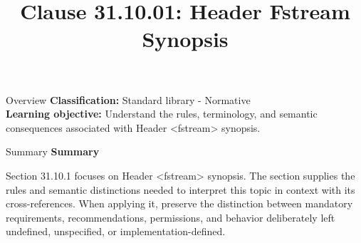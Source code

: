 \documentclass[10pt,letterpaper]{article}
\title{Clause 31.10.01: Header Fstream Synopsis}
\author{}
\date{}
\begin{document}
\maketitle
\begin{CornellOverviewBox}{Overview}
\textbf{Classification:} Standard library - Normative\\[2pt]
\textbf{Learning objective:} Understand the rules, terminology, and semantic consequences associated with Header <fstream> synopsis.
\end{CornellOverviewBox}\begin{CornellSummaryBox}{Summary}
{\sffamily\bfseries\color{Accent} Summary}\par\vspace{3pt}Section 31.10.1 focuses on Header <fstream> synopsis. The section supplies the rules and semantic distinctions needed to interpret this topic in context with its cross-references. When applying it, preserve the distinction between mandatory requirements, recommendations, permissions, and behavior deliberately left undefined, unspecified, or implementation-defined.
\end{CornellSummaryBox}
\end{document}
